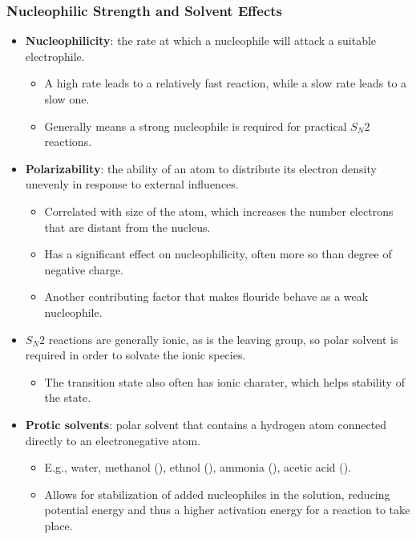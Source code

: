 \documentclass[12pt,a4paper]{article}
\begin{document}
\begin{itemize}
    \subsubsection{Nucleophilic Strength and Solvent Effects}
    \begin{itemize}
        \item \textbf{Nucleophilicity}: the rate at which a nucleophile will attack a suitable electrophile.
            \begin{itemize}
                \item A high rate leads to a relatively fast reaction, while a slow rate leads to a slow one.
                \item Generally means a strong nucleophile is required for practical \(S_N2\) reactions.
            \end{itemize}
        \item \textbf{Polarizability}: the ability of an atom to distribute its electron density unevenly in response to external influences.
            \begin{itemize}
                \item Correlated with size of the atom, which increases the number electrons that are distant from the nucleus.
                \item Has a significant effect on nucleophilicity, often more so than degree of negative charge.
                \item Another contributing factor that makes flouride behave as a weak nucleophile.
            \end{itemize}
        \item \(S_N2\) reactions are generally ionic, as is the leaving group, so polar solvent is required in order to solvate the ionic species.
            \begin{itemize}
                \item The transition state also often has ionic charater, which helps stability of the state.
            \end{itemize}
        \item \textbf{Protic solvents}: polar solvent that contains a hydrogen atom connected directly to an electronegative atom. 
            \begin{itemize}
                \item E.g., water, methanol (), ethnol (), ammonia (), acetic acid ().
                \item Allows for {\color{o-Sun}stabilization of added nucleophiles} in the solution, reducing potential energy and thus a {\color{o-Sun}higher activation energy} for a reaction to take place. 

\end{itemize}
\end{itemize}
\end{itemize}
\end{document}
